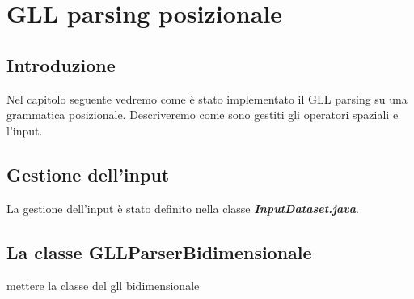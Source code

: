 \chapter{GLL parsing posizionale}
\section{Introduzione}
Nel capitolo seguente vedremo come è stato implementato il GLL parsing su una grammatica posizionale. Descriveremo come sono gestiti gli operatori spaziali e l'input. 
\section{Gestione dell'input}
La gestione dell'input è stato definito nella classe \textbf{\textit{InputDataset.java}}.

\section{La classe GLLParserBidimensionale}
mettere la classe del gll bidimensionale